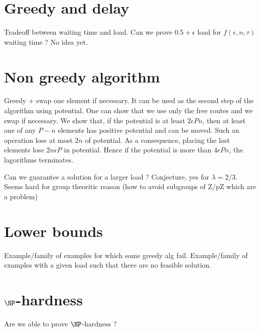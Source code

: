 \documentclass[10pt, conference, letterpaper]{IEEEtran}
\begin{document}
\section{Greedy and delay}

Tradeoff between waiting time and load. Can we prove $0.5 + \epsilon$ load for $f(\epsilon,n,\tau)$ waiting time ?  No idea yet.


\section{Non greedy algorithm}

Greedy + swap one element if necessary. It can be used as the second step of the algorithm using potential. One can show that we use only the free routes and we swap if necessary. We show that, if the potential is at least $2\epsilon P n$, then at least one of any 
$P-n$ elements has positive potential and can be moved. Such an operation lose at most $2n$ of potential. As a consequence, placing the last elements lose $2n\epsilon P$ in potential. Hence if the potential is more than $4\epsilon P n$, the lagorithms terminates.



Can we guarantee a solution for a larger load ? Conjecture, yes for $\lambda = 2/3$. 
Seems hard for group theoritic reason (how to avoid subgroups of Z/pZ which are a problem)

\section{Lower bounds}

Example/family of examples for which some greedy alg fail.
Example/family of examples with a given load such that there are no feasible solution.

\section{$\NP$-hardness}

Are we able to prove $\NP$-hardness ?

% 
% 
\end{document}
